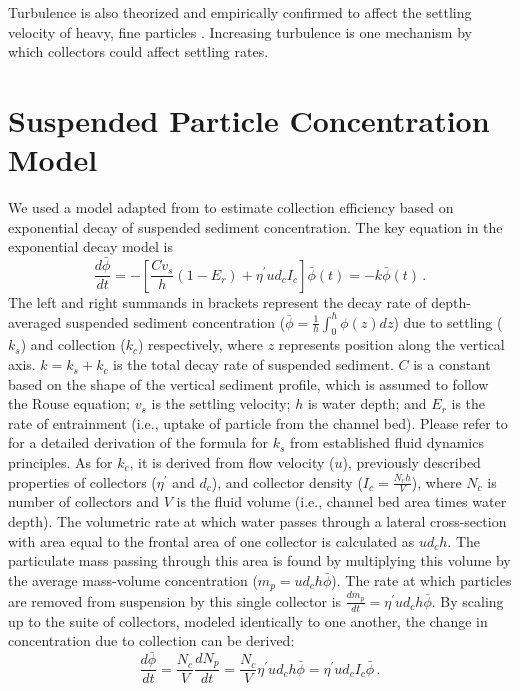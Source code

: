 \documentclass{scrreprt}
\begin{document}
Turbulence is also theorized and empirically confirmed to affect the settling velocity of heavy, fine particles \citep{Nielsen_1993, Jacobs_2016, Wang_2018}. Increasing turbulence is one mechanism by which collectors could affect settling rates.

\section{Suspended Particle Concentration Model}

We used a model adapted from \cite{Fauria_2015} to estimate collection efficiency based on exponential decay of suspended sediment concentration. The key equation in the exponential decay model is
\begin{equation}
    \frac{d\bar{\phi}}{dt} = -\left[\frac{Cv_s}{h}(1-E_r) + \eta^{\prime}ud_cI_c\right]\bar{\phi}(t) = -k\bar{\phi}(t)\,.
    \label{eq:model}    
\end{equation}
The left and right summands in brackets represent the decay rate of depth-averaged suspended sediment concentration ($\bar{\phi} = \frac{1}{h} \int_0^h\phi(z)dz$) due to settling ($k_s$) and collection ($k_c$) respectively, where $z$ represents position along the vertical axis. $k = k_s + k_c$ is the total decay rate of suspended sediment.  $C$ is a constant based on the shape of the vertical sediment profile, which is assumed to follow the Rouse equation; $v_s$ is the settling velocity; $h$ is water depth; and $E_r$ is the rate of entrainment (i.e., uptake of particle from the channel bed). Please refer to \cite{Fauria_2015} for a detailed derivation of the formula for $k_s$ from established fluid dynamics principles. As for $k_c$, it is derived from flow velocity ($u$), previously described properties of collectors ($\eta^\prime$ and $d_c$), and collector density ($I_c = \frac{N_ch}{V}$), where $N_c$ is number of collectors and $V$ is the fluid volume (i.e., channel bed area times water depth). The volumetric rate at which water passes through a lateral cross-section with area equal to the frontal area of one collector is calculated as $ud_ch$. The particulate mass passing through this area is found by multiplying this volume by the average mass-volume concentration ($m_p = ud_ch\bar{\phi}$). The rate at which particles are removed from suspension by this single collector is $\frac{dm_p}{dt}=\eta^{\prime}ud_ch\bar{\phi}$. By scaling up to the suite of collectors, modeled identically to one another, the change in concentration due to collection can be derived:
\begin{equation}
\frac{d\bar{\phi}}{dt} = \frac{N_c}{V}\frac{dN_p}{dt} = \frac{N_c}{V}\eta^{\prime}ud_ch\bar{\phi} = \eta^{\prime}ud_cI_c\bar{\phi}\,.
\label{eq:collection}
\end{equation}
\end{document}
